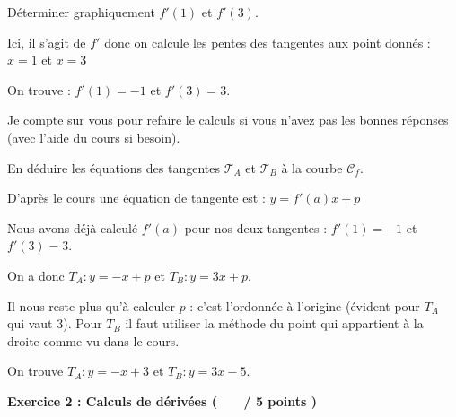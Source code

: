 \documentclass[12pt,a4paper]{exam}
\begin{document}
\begin{questions}

\question[2] Déterminer graphiquement $f'(1)$ et $f'(3)$.

{\color{red}Ici, il s'agit de $f'$ donc on calcule les pentes des tangentes aux point donnés : $x=1$ et $x=3$

On trouve : $f'(1)=-1$ et $f'(3) = 3$.

Je compte sur vous pour refaire le calculs si vous n'avez pas les bonnes réponses (avec l'aide du cours si besoin).}

\question[3] En déduire les équations des tangentes $\mathcal{T}_A$ et $\mathcal{T}_B$ à 
la courbe $\mathcal{C}_f$.

{\color{red}D'après le cours une équation de tangente est : $y = f'(a)x + p$

Nous avons déjà calculé $f'(a)$ pour nos deux tangentes : $f'(1)=-1$ et $f'(3) = 3$.

On a donc $T_A : y = -x+p$ et $T_B : y = 3x + p$.

Il nous reste plus qu'à calculer $p$ : c'est l'ordonnée à l'origine (évident pour $T_A$ qui vaut $3$). Pour 
$T_B$ il faut utiliser la méthode du point qui appartient à la droite comme vu dans le cours.

On trouve $T_A : y = -x+3$ et $T_B : y = 3x - 5$.
}

\end{questions}

\vspace{1cm}

\noindent
\textbf{Exercice 2 : Calculs de dérivées ( \ \ \ / 5 points )}

\vspace{10pt}
\noindent
\end{document}
